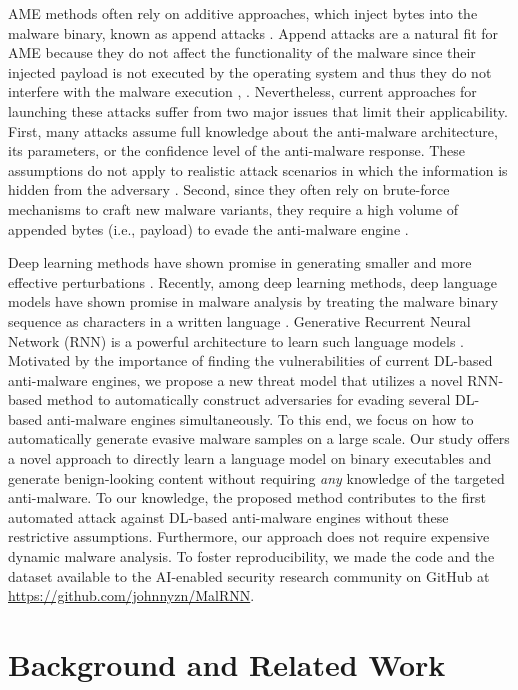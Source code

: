 \documentclass[letterpaper]{article}
\begin{document}
AME methods often rely on additive approaches, which inject bytes into the malware binary, known as append attacks \cite{suciu2019exploring}. Append attacks are a natural fit for AME because they do not affect the functionality of the malware since their injected payload is not executed by the operating system and thus they do not interfere with the malware execution \cite{castroandbiggio2019poster}, \cite{suciu2019exploring}. Nevertheless, current approaches for launching these attacks suffer from two major issues that limit their applicability. First, many attacks assume full knowledge about the anti-malware architecture, its parameters, or the confidence level of the anti-malware response. These assumptions do not apply to realistic attack scenarios in which the information is hidden from the adversary \cite{hu2018black}. Second, since they often rely on brute-force mechanisms to craft new malware variants, they require a high volume of appended bytes (i.e., payload) to evade the anti-malware engine \cite{suciu2019exploring}.

Deep learning methods have shown promise in generating smaller and more effective perturbations \cite{kreuk2018adversarial}. Recently, among deep learning methods, deep language models have shown promise in malware analysis by treating the malware binary sequence as characters in a written language \cite{awad2018modeling}. Generative Recurrent Neural Network (RNN) is a powerful architecture to learn such language models \cite{mogren2019character}. Motivated by the importance of finding the vulnerabilities of current DL-based anti-malware engines, we propose a new threat model that utilizes a novel RNN-based method to automatically construct adversaries for evading several DL-based anti-malware engines simultaneously. To this end, we focus on how to automatically generate evasive malware samples on a large scale. Our study offers a novel approach to directly learn a language model on binary executables and generate benign-looking content without requiring \textit{any} knowledge of the targeted anti-malware. To our knowledge, the proposed method contributes to the first automated attack against DL-based anti-malware engines without these restrictive assumptions. Furthermore, our approach does not require expensive dynamic malware analysis. To foster reproducibility, we made the code and the dataset available to the AI-enabled security research community on GitHub at {\color{blue}\underline{https://github.com/johnnyzn/MalRNN}}.

\section{Background and Related Work}
\label{background}
\end{document}
